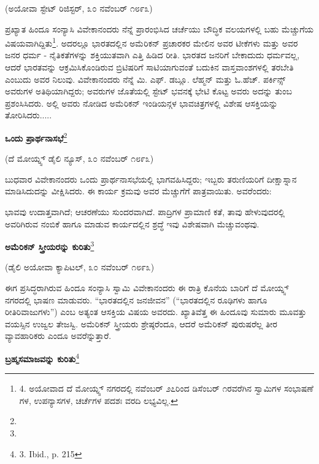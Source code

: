 (ಅಯೋವಾ ಸ್ಟೇಟ್ ರಿಜಿಸ್ಟರ್, ೩೦ ನವೆಂಬರ್ ೧೮೯೩)

ಪ್ರಖ್ಯಾತ ಹಿಂದೂ ಸಂನ್ಯಾಸಿ ವಿವೇಕಾನಂದರು ನೆನ್ನೆ ಪ್ರಾರಂಭಿಸಿದ ಚರ್ಚೆಯು ಬೌದ್ಧಿಕ ವಲಯಗಳಲ್ಲಿ ಬಹು ಮೆಚ್ಚುಗೆಯ ವಿಷಯವಾಗಿದ್ದಿತು\footnote{4. ಅಯೋವಾದ ದೆ ಮೋಯ್ನ್ಸ್ ನಗರದಲ್ಲಿ ನವೆಂಬರ್ ೨೭ರಿಂದ ಡಿಸೆಂಬರ್ ೧ರವರೆಗಿನ ಸ್ವಾಮಿಗಳ ಸಂಭಾಷಣೆ ಗಳ, ಉಪನ್ಯಾಸಗಳ, ಚರ್ಚೆಗಳ ಪದಶಃ ವರದಿ ಲಭ್ಯವಿಲ್ಲ.}. ಅದರಲ್ಲೂ ಭಾರತದಲ್ಲಿನ ಅಮೆರಿಕನ್ ಪ್ರಚಾರಕರ ಮೇಲಿನ ಅವರ ಟೀಕೆಗಳು ಮತ್ತು ಅವರ ಜನರ ಧರ್ಮ - ನೈತಿಕತೆಗಳನ್ನು ಶಕ್ತಿಯುತವಾಗಿ ಎತ್ತಿ ಹಿಡಿದ ರೀತಿ. ಭಾರತದ ಜನರಿಗೆ ಬೇಕಾದುದು ಧರ್ಮವಲ್ಲ, ಆದರೆ ಭಾರತವನ್ನು ಆಕ್ರಮಿಸಿಕೊಂಡಿರುವ ಬ್ರಿಟಿಷರಿಗೆ ಸಾಟಿಯಾಗುವಂತೆ ಬದುಕಿನ ವಾಸ್ತವಾಂಶಗಳಲ್ಲಿ ತರಬೇತಿ ಎಂಬುದು ಅವರ ನಿಲುವು. ವಿವೇಕಾನಂದರು ನೆನ್ನೆ ಮಿ. ಎಫ್. ಡಬ್ಲೂ. ಲೆಹ್ಮನ್ ಮತ್ತು ಓ.ಹೆಚ್. ಪರ್ಕಿನ್ಸ್ ಅವರುಗಳ ಅತಿಥಿಯಾಗಿದ್ದರು; ಅವರುಗಳ ಜೊತೆಯಲ್ಲಿ ಸ್ಟೇಟ್ ಭವನಕ್ಕೆ ಭೇಟಿ ಕೊಟ್ಟ ಅವರು ಅದನ್ನು ತುಂಬ ಪ್ರಶಂಸಿಸಿದರು. ಅಲ್ಲಿ ಅವರು ನೋಡಿದ ಅಮೆರಿಕನ್ ಇಂಡಿಯನ್ಗಳ ಭಾವಚಿತ್ರಗಳಲ್ಲಿ ವಿಶೇಷ ಆಸಕ್ತಿಯನ್ನು ತೋರಿಸಿದರು.....

\begin{center}
\textbf{ಒಂದು ಪ್ರಾರ್ಥನಾಸಭೆ}\footnote{}
\end{center}

\begin{center}
(ದೆ ಮೋಯ್ನ್ಸ್ ಡೈಲಿ ನ್ಯೂಸ್, ೩೦ ನವೆಂಬರ್ ೧೮೯೩)
\end{center}

ಬುಧವಾರ ವಿವೇಕಾನಂದರು ಒಂದು ಪ್ರಾರ್ಥನಾಸಭೆಯಲ್ಲಿ ಭಾಗವಹಿಸಿದ್ದರು; ಇಬ್ಬರು ತರುಣಿಯರಿಗೆ ದೀಕ್ಷಾಸ್ನಾನ ಮಾಡಿಸಿದುದನ್ನು ವೀಕ್ಷಿಸಿದರು. ಈ ಕಾರ್ಯ ಕ್ರಮವು ಅವರ ಮೆಚ್ಚುಗೆಗೆ ಪಾತ್ರವಾಯಿತು. ಅವರೆಂದರು:

ಭಾವವು ಉದಾತ್ತವಾಗಿದೆ; ಆಚರಣೆಯು ಸುಂದರವಾಗಿದೆ. ಪಾದ್ರಿಗಳ ಪ್ರಾಮಾಣಿ ಕತೆ, ತಾವು ಹೇಳುವುದರಲ್ಲಿ ಅವರಿಗಿರುವ ನಂಬಿಕೆ ಹಾಗೂ ಮಾಡುವ ಕಾರ್ಯದಲ್ಲಿನ ಶ್ರದ್ಧೆ ಇವು ವಿಶೇಷವಾಗಿ ಮೆಚ್ಚುವಂಥವು.

\begin{center}
\textbf{ಅಮೆರಿಕನ್ ಸ್ತ್ರೀಯರನ್ನು ಕುರಿತು}\footnote{}
\end{center}

\begin{center}
(ಡೈಲಿ ಅಯೋವಾ ಕ್ಯಾಪಿಟಲ್, ೩೦ ನವೆಂಬರ್ ೧೮೯೩)
\end{center}

ಈಗ ಪ್ರಸಿದ್ಧರಾಗಿರುವ ಹಿಂದೂ ಸಂನ್ಯಾಸಿ ಸ್ವಾಮಿ ವಿವೇಕಾನಂದರು ಈ ರಾತ್ರಿ ಕೊನೆಯ ಬಾರಿಗೆ ದೆ ಮೋಯ್ನ್ಸ್ ನಗರದಲ್ಲಿ ಭಾಷಣ ಮಾಡುವರು. “ಭಾರತದಲ್ಲಿನ ಜನಜೀವನ” (“ಭಾರತದಲ್ಲಿನ ರೂಢಿಗಳು ಹಾಗೂ ರೀತಿರಿವಾಜುಗಳು”) ಎಂಬ ಅತ್ಯಂತ ಆಸಕ್ತಿಯ ವಿಷಯ ಅವರದು. ಖ್ಯಾತಿವೆತ್ತ ಈ ಹಿಂದೂವು ಸುಮಾರು ಮೂವತ್ತು ವಯಸ್ಸಿನ ಉಜ್ವಲ ತೇಜಸ್ವಿ. ಅಮೆರಿಕನ್ ಸ್ತ್ರೀಯರು ಶ್ರೇಷ್ಠರೆಂದೂ, ಆದರೆ ಅಮೆರಿಕನ್ ಪುರುಷರೆಲ್ಲ ತೀರ ವ್ಯಾವಹಾರಿಕರು ಎಂದೂ ಅವರೆನ್ನುತ್ತಾರೆ.

\begin{center}
\textbf{ಬ್ರಹ್ಮಸಮಾಜವನ್ನು ಕುರಿತು}\footnote{3. Ibid., p. 215}
\end{center}

